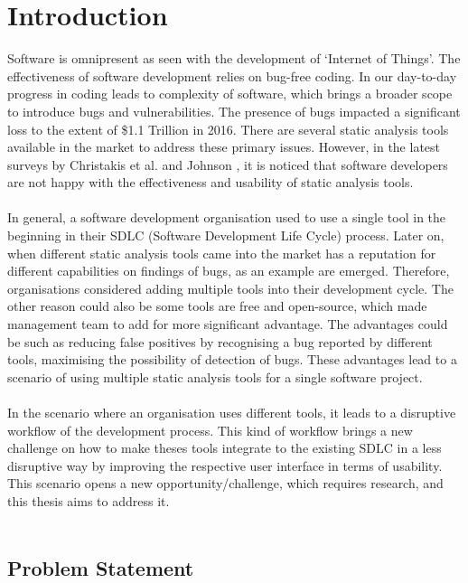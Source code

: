 \chapter{Introduction}
\label{ch:introduction_report}

Software is omnipresent as seen with the development of ‘Internet of Things’. \cite{se} The effectiveness of software development relies on bug-free coding. In our day-to-day progress in coding leads to complexity of software, which brings a broader scope to introduce bugs and vulnerabilities. The presence of bugs impacted a significant loss to the extent of \$1.1 Trillion in 2016. \cite{report} There are several static analysis tools available in the market to address these primary issues. However, in the latest surveys by Christakis et al. \cite{CB16} and Johnson \etal{} \cite{JSMB13}, it is noticed that software developers are not happy with the effectiveness and usability of static analysis tools.
\\ \\

In general, a software development organisation used to use a single tool in the beginning in their SDLC (Software Development Life Cycle) process. Later on, when different static analysis tools came into the market has a reputation for different capabilities on findings of bugs, as an example are emerged. Therefore, organisations considered adding multiple tools into their development cycle. The other reason could also be some tools are free and open-source, which made management team to add for more significant advantage. The advantages could be such as reducing false positives by recognising a bug reported by different tools, maximising the possibility of detection of bugs. These advantages lead to a scenario of using multiple static analysis tools for a single software project.
\\ \\

In the scenario where an organisation uses different tools, it leads to a disruptive workflow of the development process. This kind of workflow brings a new challenge on how to make theses tools integrate to the existing SDLC in a less disruptive way by improving the respective user interface in terms of usability. This scenario opens a new opportunity/challenge, which requires research, and this thesis aims to address it.
\\ \\
\clearpage

\section{Problem Statement}

